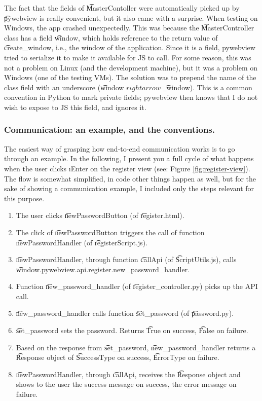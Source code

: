 The fact that the fields of \t{MasterContoller} were automatically picked up by \t{pywebview} is really convenient, but it also came with a surprise.
When testing on Windows, the app crashed unexpectedly.
This was because the \t{MasterController} class has a field \t{window}, which holds reference to the return value of \t{create\_window}, i.e., the window of the application.
Since it is a field, pywebview tried to serialize it to make it available for JS to call.
For some reason, this was not a problem on Linux (and the development machine), but it was a problem on Windows (one of the testing VMs).
The solution was to prepend the name of the class field with an underscore (\t{window} $rightarrow$ \t{\_window}).
This is a common convention in Python to mark private fields; pywebview then knows that I do not wish to expose to JS this field, and ignores it.

\subsubsection{Communication: an example, and the conventions.}

The easiest way of grasping how end-to-end communication works is to go through an example.
In the following, I present you a full cycle of what happens when the user clicks \i{Enter} on the register view (see: Figure \ref{fig:register-view}).
The flow is somewhat simplified, in code other things happen as well, but for the sake of showing a communication example, I included only the steps relevant for this purpose.

\begin{enumerate}
  \item The user clicks \t{newPasswordButton} (of \t{register.html}).
  \item The click of \t{newPasswordButton} triggers the call of function \t{newPasswordHandler} (of \t{registerScript.js}).
  \item \t{newPasswordHandler}, through function \t{callApi} (of \t{ScriptUtils.js}), calls \t{window.pywebview.api.register.new\_password\_handler}.
  \item Function \t{new\_password\_handler} (of \t{register\_controller.py}) picks up the API call.
  \item \t{new\_password\_handler} calls function \t{set\_password} (of \t{password.py}).
  \item \t{set\_password} sets the password. Returns \t{True} on success, \t{False} on failure.
  \item Based on the response from \t{set\_password}, \t{new\_password\_handler} returns a \t{Response} object of \t{SuccessType} on success, \t{ErrorType} on failure.
  \item \t{newPasswordHandler}, through \t{callApi}, receives the \t{Response} object and shows to the user the success message on success, the error message on failure.
\end{enumerate}

